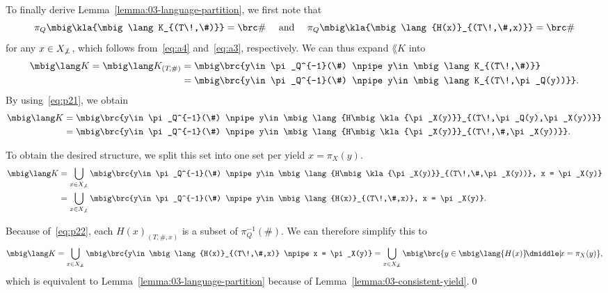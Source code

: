 To finally derive Lemma~\ref{lemma:03-language-partition}, we first note that
\begin{equation}\label{eq:p22}
 \pi_Q\mbig\kla{\mbig\lang K_{(T\!,\#)}} = \brc\#
 \quad\text{ and }\quad
 \pi_Q\mbig\kla{\mbig\lang{H(x)}_{(T\!,\#,x)}} = \brc\#
\end{equation}
for any $x\in X_{\not\bot}$, which follows from~\eqref{eq:a4} and~\eqref{eq:a3}, respectively.
We can thus expand $\lang K$ into
\begin{align*}
 \mbig\lang K
 = \mbig\lang K_{(T\!,\#)}
 &= \mbig\brc{y\in \pi_Q^{-1}(\#) \npipe y\in\mbig\lang K_{(T\!,\#)}} \\
 &= \mbig\brc{y\in \pi_Q^{-1}(\#) \npipe y\in\mbig\lang K_{(T\!,\pi_Q(y))}}.
\end{align*}
By using~\eqref{eq:p21}, we obtain
\begin{align*}
 \mbig\lang K
 &= \mbig\brc{y\in \pi_Q^{-1}(\#) \npipe y\in\mbig\lang{H\mbig\kla{\pi_X(y)}}_{(T\!,\pi_Q(y),\pi_X(y))}} \\
 &= \mbig\brc{y\in \pi_Q^{-1}(\#) \npipe y\in\mbig\lang{H\mbig\kla{\pi_X(y)}}_{(T\!,\#,\pi_X(y))}}.
\end{align*}

To obtain the desired structure, we split this set into one set per yield $x = \pi_X(y)$.
\begin{align*}
 \mbig\lang K
 &= \bigcup_{x\in X_{\not\bot}} \mbig\brc{y\in \pi_Q^{-1}(\#) \npipe y\in\mbig\lang{H\mbig\kla{\pi_X(y)}}_{(T\!,\#,\pi_X(y))}, x = \pi_X(y)} \\
 &= \bigcup_{x\in X_{\not\bot}} \mbig\brc{y\in \pi_Q^{-1}(\#) \npipe y\in\mbig\lang{H(x)}_{(T\!,\#,x)}, x = \pi_X(y)}.
\end{align*}

Because of~\eqref{eq:p22}, each $H(x)_{(T,\#,x)}$ is a subset of $\pi_Q^{-1}(\#)$. We can therefore simplify this to
\[
 \mbig\lang K
 = \bigcup_{x\in X_{\not\bot}} \mbig\brc{y\in \mbig\lang{H(x)}_{(T\!,\#,x)} \npipe x = \pi_X(y)}
 = \bigcup_{x\in X_{\not\bot}} \mbig\brc{y\in \mbig\lang{H(x)} \npipe x = \pi_X(y)},
\]
which is equivalent to Lemma~\ref{lemma:03-language-partition} because of Lemma~\ref{lemma:03-consistent-yield}.\qed

\endinput
which is equivalent to the desired statement,
\[
 \mbig\lang K = \bigcup_{x\in X_{\not\bot}} \mbig\lang{H(x)},
\]
because of Lemma~\ref{lemma:03-consistent-yield}.\qed
